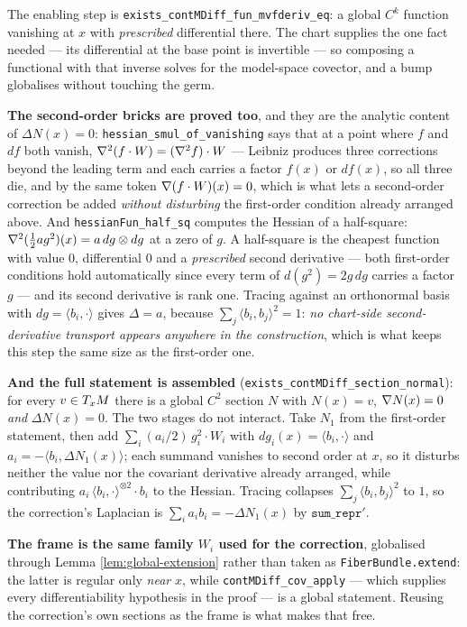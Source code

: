 \begin{lemma}
  The enabling step is \texttt{exists\_contMDiff\_fun\_mvfderiv\_eq}: a global $C^k$ function
  vanishing at $x$ with \emph{prescribed} differential there. The chart supplies the one fact
  needed --- its differential at the base point is invertible --- so composing a functional
  with that inverse solves for the model-space covector, and a bump globalises without
  touching the germ.

  \textbf{The second-order bricks are proved too}, and they are the analytic content of
  $\Delta N(x) = 0$: \texttt{hessian\_smul\_of\_vanishing} says that at a point where $f$ and
  $df$ both vanish, $\nabla^2(f\cdot W) = (\nabla^2 f)\cdot W$ --- Leibniz produces three
  corrections beyond the leading term and each carries a factor $f(x)$ or $df(x)$, so all
  three die, and by the same token $\nabla(f\cdot W)(x) = 0$, which is what lets a second-order
  correction be added \emph{without disturbing} the first-order condition already arranged
  above. And \texttt{hessianFun\_half\_sq} computes the Hessian of a half-square:
  $\nabla^2(\tfrac12 a g^2)(x) = a\,dg \otimes dg$ at a zero of $g$. A half-square is the
  cheapest function with value $0$, differential $0$ and a \emph{prescribed} second derivative
  --- both first-order conditions hold automatically since every term of $d(g^2) = 2g\,dg$
  carries a factor $g$ --- and its second derivative is rank one. Tracing against an
  orthonormal basis with $dg = \langle b_i,\cdot\rangle$ gives $\Delta = a$, because
  $\sum_j \langle b_i, b_j\rangle^2 = 1$: \emph{no chart-side second-derivative transport
  appears anywhere in the construction}, which is what keeps this step the same size as the
  first-order one.

  \textbf{And the full statement is assembled}
  (\texttt{exists\_contMDiff\_section\_normal}): for every $v \in T_xM$ there is a global
  $C^2$ section $N$ with $N(x) = v$, $\nabla N(x) = 0$ \emph{and} $\Delta N(x) = 0$. The two
  stages do not interact. Take $N_1$ from the first-order statement, then add
  $\sum_i (a_i/2)\,g_i^2 \cdot W_i$ with $dg_i(x) = \langle b_i,\cdot\rangle$ and
  $a_i = -\langle b_i, \Delta N_1(x)\rangle$; each summand vanishes to second order at $x$, so
  it disturbs neither the value nor the covariant derivative already arranged, while
  contributing $a_i\,\langle b_i,\cdot\rangle^{\otimes 2}\cdot b_i$ to the Hessian. Tracing
  collapses $\sum_j \langle b_i,b_j\rangle^2$ to $1$, so the correction's Laplacian is
  $\sum_i a_i b_i = -\Delta N_1(x)$ by $\mathtt{sum\_repr'}$.

  \textbf{The frame is the same family $W_i$ used for the correction}, globalised through
  Lemma \ref{lem:global-extension} rather than taken as \texttt{FiberBundle.extend}: the latter
  is regular only \emph{near} $x$, while \texttt{contMDiff\_cov\_apply} --- which supplies
  every differentiability hypothesis in the proof --- is a global statement. Reusing the
  correction's own sections as the frame is what makes that free.


\end{lemma}
